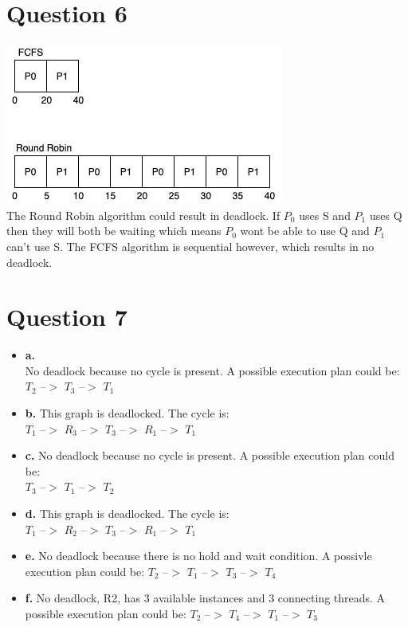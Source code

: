 \documentclass[11pt]{article}
\begin{document}
\section*{Question 6}
\includegraphics[scale=0.5]{COMS352HW6Q6}\\
The Round Robin algorithm could result in deadlock. If $P_0$ 
uses S and $P_1$ uses Q then they will both be waiting which 
means $P_0$ wont be able to use Q and $P_1$ can't use S. The 
FCFS algorithm is sequential however, which results in no deadlock.
\section*{Question 7}
\begin{itemize}
    \item \textbf{a.}\\
        No deadlock because no cycle is present. A possible execution 
        plan could be:\\ 
        $T_2$ --$>$ $T_3$ --$>$ $T_1$
    \item \textbf{b.}
        This graph is deadlocked. The cycle is:\\ 
        $T_1$ --$>$ $R_3$ --$>$ $T_3$ --$>$ $R_1$ --$>$ $T_1$
    \item \textbf{c.}
        No deadlock because no cycle is present. A possible execution 
        plan could be:\\ 
        $T_3$ --$>$ $T_1$ --$>$ $T_2$
    \item \textbf{d.}
        This graph is deadlocked. The cycle is:\\
         $T_1$ --$>$ $R_2$ --$>$ $T_3$ --$>$ $R_1$ --$>$ $T_1$
    \item \textbf{e.}
        No deadlock because there is no hold and wait condition.
        A possivle execution plan could be: 
        $T_2$ --$>$ $T_1$ --$>$ $T_3$ --$>$ $T_4$
    \item \textbf{f.}
        No deadlock, R2, has 3 available instances and 
        3 connecting threads. A possible execution plan could 
        be: 
        $T_2$ --$>$ $T_4$ --$>$ $T_1$ --$>$ $T_3$
\end{itemize}
\end{document}
